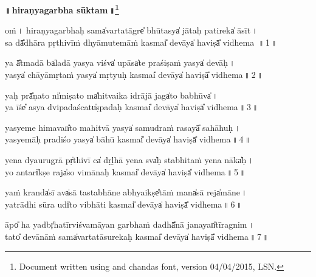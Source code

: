 \documentclass[parskip, DIV=14]{scrartcl}
\renewcommand{\thefootnote}{\fnsymbol{footnote}} %
\begin{document}

\vspace{-1.5cm}

\begin{center}
\textbf{{\Huge॥\,hiraṇyagarbha sūktam\,॥\LARGE\let\thefootnote\relax\footnote{\color{lightgray} Document written using \XeLaTeX{} and chandas font, version 04/04/2015, LSN.}}}
\end{center}
\large

\centering	

\vspace{0.5cm}

oṁ\,। hi॒ra॒ṇya॒ga॒rbhaḥ sama̍varta॒tāgre̎ bhū॒tasya̍ jā॒taḥ pati॒reka̍ āsīt\,। \\
sa dā̎dhāra pṛthi॒vīṁ dhyāmu॒temāṁ kasmai̎ de॒vāya̍ ha॒viṣā̎ vidhema \,॥\,1\,॥ \par 

ya ā̎tma॒dā ba̍la॒dā yasya॒ viśva̍ u॒pāsa̍te pra॒śiṣa॒ṁ yasya̍ de॒vāḥ\,। \\
yasya̍ chā॒yāmṛta॒ṁ yasya̍ mṛ॒tyuḥ kasmai̎ de॒vāya̍ ha॒viṣā̎ vidhema\,॥\,2\,॥ \par 

yaḥ prā̎ṇa॒to ni̍miṣa॒to ma̍hi॒tvaika॒ idrājā॒ jaga̍to ba॒bhūva̍\,। \\
ya īśe̎ a॒sya dvi॒pada॒ścatu̍ṣpada॒ḥ kasmai̎ de॒vāya̍ ha॒viṣā̎ vidhema\,॥\,3\,॥ \par 

yasye॒me hi॒mavan̎to mahi॒tvā yasya̍ samu॒draṁ ra॒sayā̎ sa॒hāhuḥ\,। \\
yasye॒māḥ pra॒diśo॒ yasya̍ bā॒hū kasmai̎ de॒vāya̍ ha॒viṣā̎ vidhema\,॥\,4\,॥ \par 

yena॒ dyauru॒grā pṛ̍thi॒vī ca̍ dṛ॒ḻhā yena॒ sva̍ḥ stabhi॒taṁ yena॒ nāka̍ḥ\,। \\
yo a॒ntari̍kṣe॒ raja̍so vi॒māna॒ḥ kasmai̎ de॒vāya̍ ha॒viṣā̎ vidhema\,॥\,5\,॥ \par 

yaṁ kranda̍sī॒ ava̍sā tastabhā॒ne a॒bhyaikṣe̎tā॒ṁ mana̍sā॒ reja̍māne\,। \\
yatrādhi॒ sūra॒ udi̍to vi॒bhāti॒ kasmai̎ de॒vāya̍ ha॒viṣā̎ vidhema\,॥\,6\,॥ \par 

āpo̎ ha॒ yadbṛ̍ha॒tīrvi॒śvamāya॒n garbha॒ṁ dadhā̎nā ja॒nayan̎tīra॒gnim\,। \\
tato̎ de॒vānā॒ṁ sama̍varta॒tāsu॒reka॒ḥ kasmai̎ de॒vāya̍ ha॒viṣā̎ vidhema\,॥\,7\,॥ \par 
\end{document}
